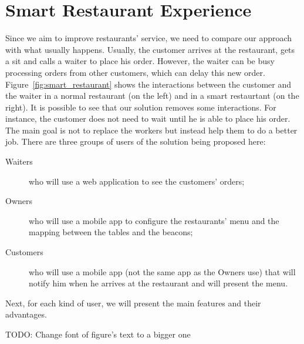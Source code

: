 
\section{Smart Restaurant Experience}
\label{sec:smart_restaurant_experience}

Since we aim to improve restaurants' service, we need to compare our approach
with what usually happens.
Usually, the customer arrives at the restaurant, gets a sit and calls a waiter
to place his order. However, the waiter can be busy processing orders
from other customers, which can delay this new order.
Figure~\ref{fig:smart_restaurant} shows the interactions between the
customer and the waiter in a normal restaurant (on the left) and in
a smart restaurtant (on the right). It is possible to see that our
solution removes some interactions. For instance, the customer does not
need to wait until he is able to place his order.
The main goal is not to replace the workers but instead help them to do a
better job.
There are three groups of users of the solution being proposed here:

\begin{description}
  \item[Waiters] who will use a web application to see the customers'
  orders;
  \item[Owners] who will use a mobile app to configure the
  restaurants' menu and the mapping between the tables and the beacons;
  \item[Customers] who will use a mobile app (not the same app as the
  Owners use) that will notify him when he arrives at the restaurant and
  will present the menu.
\end{description}

Next, for each kind of user, we will present the main features and their
advantages.

TODO: Change font of figure's text to a bigger one

